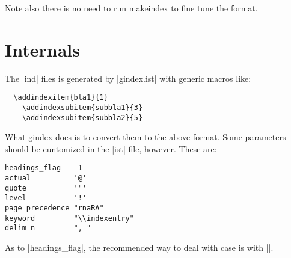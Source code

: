 \documentclass[a4paper]{ltxguide}
\begin{document}
Note also there is no need to run \textsf{makeindex} to fine tune the
format.

\section{Internals}

The |ind| files is generated by |gindex.ist| with generic macros like:
\begin{verbatim}
  \addindexitem{bla1}{1}
    \addindexsubitem{subbla1}{3}
    \addindexsubitem{subbla2}{5}
\end{verbatim}
What \textsf{gindex} does is to convert them to the above format. Some
parameters should be cuntomized in the |ist| file, however. These are:
\begin{verbatim}
headings_flag   -1
actual          '@'
quote           '"'
level           '!'
page_precedence "rnaRA"
keyword         "\\indexentry"
delim_n         ", "
\end{verbatim}
As to |headings_flag|, the recommended way to deal with case is with
|\indexheading|.
\end{document}

